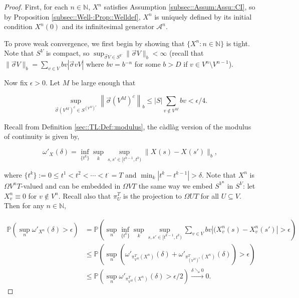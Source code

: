 \documentclass[12pt]{article}
\newcommand{\mb}{\mathbb}
\newcommand{\mc}{\mathcal}
\newcommand{\ra}{\rightarrow}
\newcommand{\os}{\overset}
\newcommand{\ep}{\epsilon}
\newcommand{\ind}{\hspace{24pt}}
\newcommand{\pr}{\mb{P}}							%
\renewcommand{\v}{v}							%
\renewcommand{\U}{U}							%
\renewcommand{\S}{S}							%
\newcommand{\s}{\sigma}							%
\newcommand{\sv}{\vec{\s}}						%
\renewcommand{\b}{b}							%
\newcommand{\T}{T}								%
\renewcommand{\t}{t}							%
\newcommand{\degr}{D}								%
\newcommand{\IG}{\mc{A}}						%
\newcommand{\pup}[1]{^{#1}}							%
\newcommand{\V}{V}									%
\renewcommand{\tt}{s}								%
\newcommand{\ttt}{s'}								%
\renewcommand{\it}{k}								%
\newcommand{\numb}{n}								%
\newcommand{\XState}[1]{\S^{#1}}				%
\newcommand{\piV}[2]{\pi_{#1}^{#2}}					%
\newcommand{\rxvt}[2]{X_{#1}{(#2)}}					%
\newcommand{\rxvtn}[3]{X_{#1}^{#3}(#2)}				%
\newcommand{\rxvts}[2]{X_{#1}{#2}}					%
\newcommand{\rxvtsn}[3]{X_{#1}^{#3}{#2}}			%
\begin{document}
\begin{proof}
First, for each \(\numb\in\mb{N}\), \(\rxvtsn{}{}{\numb}\) satisfies Assumption \ref{subsec::Assum:Assu::CI}, so by Proposition \ref{subsec::Well-:Prop::Welldef}, \(\rxvtsn{}{}{\numb}\) is uniquely defined by its initial condition \(\rxvtn{}{0}{\numb}\) and its infinitesimal generator \(\IG\pup{\numb}\).

\ind To prove weak convergence, we first begin by showing that \(\{\rxvtsn{}{}{\numb}:\numb\in \mb{N}\}\) is tight. Note that \(\S^\V\) is compact, so \(\sup_{\sv{}{\V} \in \S^\V} \|\sv{}{\V}\|_{\b{}} < \infty\) (recall that \(\|\sv{}{\V}\|_{\b{}} = \sum_{\v \in \V} \b{\v} |\sv{\v}{\V}|\) where \(\b{\v} = \b{}^{-\numb}\) for some \(\b{} > \degr\) if \(\v \in \V\pup{\numb}\setminus \V\pup{\numb-1}\)).

\ind Now fix \(\ep > 0\). Let \(M\) be large enough that

\[\sup_{\sv{}{\left(\V\pup{M}\right)^c} \in \S^{\left(\V\pup{M}\right)^c}} \left\|\sv{}{\left(\V\pup{M}\right)^c}\right\|_{\b{}} \leq |\S|\sum_{\v \notin \V\pup{M}} \b{\v} < \ep/4.\]

Recall from Definition \ref{sec::TL:Def::modulus}, the c\`adl\`ag version of the modulus of continuity is given by,

\[\omega'_{\rxvts{}{}}(\delta) = \inf_{\{\t\pup{\it}\}} \sup_\it \sup_{\tt,\ttt \in [\t\pup{\it-1},\t\pup{\it})} \|\rxvt{}{\tt} - \rxvt{}{\ttt}\|_{\b{}},\]

where \(\{\t\pup{\it}\} := 0 \leq \t\pup{1} < \t\pup{2} < \cdots < \t\pup{\cdot} = \T\) and \(\min_\it|\t\pup{\it} - \t\pup{\it-1}| > \delta\). Note that \(\rxvtsn{}{}{\numb}\) is \(\Omega{\V\pup{\numb}}{\T}\)-valued and can be embedded in \(\Omega{\V}{\T}\) the same way we embed \(\S^{\V\pup{\numb}}\) in \(\S^\V\): let \(\rxvtsn{\v}{}{\numb} \equiv 0\) for \(\v \notin \V\pup{\numb}\). Recall also that \(\piV{\U}{\T}\) is the projection to \(\Omega{\U}{\T}\) for all \(\U\subseteq \V\). Then for any \(\numb\in \mb{N}\),

\begin{align*}
\pr\left(\sup_\numb \omega'_{\rxvtsn{}{}{\numb}}(\delta) > \epsilon\right) &= \pr\left(\sup_\numb\inf_{\{\t\pup{\it}\}}\sup_\it\sup_{\tt,\ttt \in [\t\pup{\it-1},\t\pup{\it})} \sum_{\v \in \V} \b{\v}|(\rxvtn{\v}{\tt}{\numb} - \rxvtn{\v}{\ttt}{\numb}| > \epsilon \right)\\
&\leq \pr\left(\sup_\numb \left(\omega'_{\piV{\V\pup{M}}{\T}(\rxvtsn{}{}{\numb})}(\delta) + \omega'_{\piV{\left(\V\pup{M}\right)^c}{\T}(\rxvtsn{}{}{\numb})}(\delta)\right) > \ep\right)\\
&\leq \pr\left(\sup_\numb \omega'_{\piV{\V\pup{M}}{\T}(\rxvtsn{}{}{\numb})}(\delta) > \ep/2\right) \os{\delta\searrow 0}{\ra} 0.
\end{align*}


\end{proof}
\end{document}
